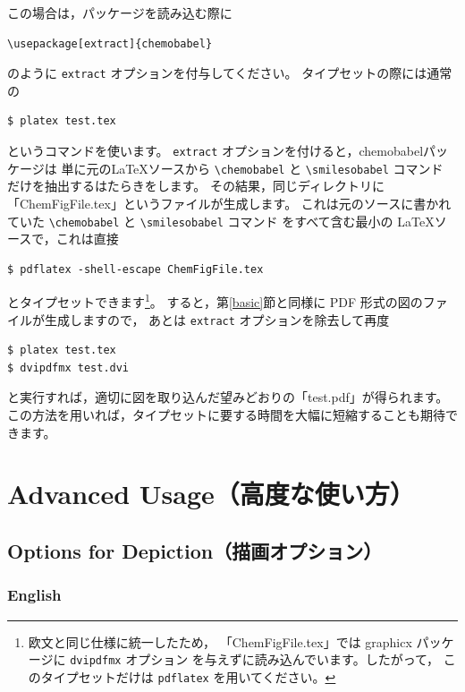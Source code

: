 \documentclass[dvipdfmx,12pt]{jsarticle}
\begin{document}
この場合は，パッケージを読み込む際に
\begin{verbatim}
\usepackage[extract]{chemobabel}
\end{verbatim}
のように \verb|extract| オプションを付与してください。
タイプセットの際には通常の
\begin{verbatim}
$ platex test.tex
\end{verbatim}
というコマンドを使います。
\verb|extract| オプションを付けると，\textsf{chemobabel}パッケージは
単に元の\LaTeX ソースから \verb|\chemobabel| と \verb|\smilesobabel| コマンド
だけを抽出するはたらきをします。
その結果，同じディレクトリに「ChemFigFile.tex」というファイルが生成します。
これは元のソースに書かれていた \verb|\chemobabel| と \verb|\smilesobabel| コマンド
をすべて含む最小の \LaTeX ソースで，これは直接
\begin{verbatim}
$ pdflatex -shell-escape ChemFigFile.tex
\end{verbatim}
とタイプセットできます\footnote{欧文と同じ仕様に統一したため，
「ChemFigFile.tex」では \textsf{graphicx} パッケージに \texttt{dvipdfmx} オプション
を与えずに読み込んでいます。したがって，
このタイプセットだけは \texttt{pdflatex} を用いてください。}。
すると，第\ref{basic}節と同様に PDF 形式の図のファイルが生成しますので，
あとは \verb|extract| オプションを除去して再度
\begin{verbatim}
$ platex test.tex
$ dvipdfmx test.dvi
\end{verbatim}
と実行すれば，適切に図を取り込んだ望みどおりの「test.pdf」が得られます。
この方法を用いれば，タイプセットに要する時間を大幅に短縮することも期待できます。

\clearpage

\section{Advanced Usage（高度な使い方）}

\subsection{Options for Depiction（描画オプション）} \label{depict}

\subsubsection{English}
\end{document}
